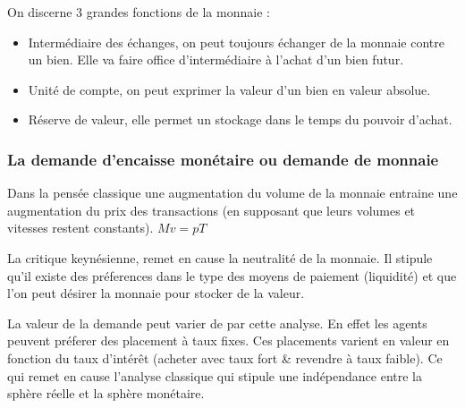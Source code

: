 On discerne 3 grandes fonctions de la monnaie : 

\begin{itemize}[label=]
	\item Intermédiaire des échanges, on peut toujours échanger de la monnaie contre un bien. Elle va faire office d'intermédiaire à l'achat d'un bien futur.
	\item Unité de compte, on peut exprimer la valeur d'un bien en valeur absolue.
	\item Réserve de valeur, elle permet un stockage dans le temps du pouvoir d'achat.
\end{itemize}


\subsubsection{La demande d'encaisse monétaire ou demande de monnaie} %
\label{sub:la_demande_d_encaisse_monetaire_ou_demande_de_monnaie}
Dans la pensée classique une augmentation du volume de la monnaie entraine une augmentation du prix des transactions (en supposant que leurs volumes et vitesses restent constants). $Mv=pT$

La critique keynésienne, remet en cause la neutralité de la monnaie. Il stipule qu'il existe des préferences dans le type des moyens de paiement (liquidité) et que l'on peut désirer la monnaie pour stocker de la valeur.

La valeur de la demande peut varier de par cette analyse. En effet les agents peuvent préferer des placement à taux fixes. Ces placements varient en valeur
en fonction du taux d'intérêt (acheter avec taux fort & revendre à taux faible). Ce qui remet en cause l'analyse classique qui stipule une indépendance entre 
la sphère réelle et la sphère monétaire.


